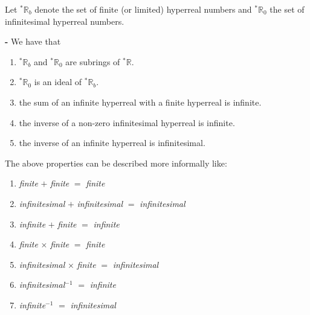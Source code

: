 \documentclass[12pt]{article}
\begin{document}
Let ${}^*\mathbb{R}_b$ denote the set of finite (or limited) hyperreal numbers and ${}^*\mathbb{R}_0$ the set of infinitesimal hyperreal numbers.

{\bf {} -} We have that
\begin{enumerate}
\item ${}^*\mathbb{R}_b$ and ${}^*\mathbb{R}_0$ are subrings of ${}^*\mathbb{R}$.
\item ${}^*\mathbb{R}_0$ is an ideal of ${}^*\mathbb{R}_b$.
\item the sum of an infinite hyperreal with a finite hyperreal is infinite.
\item the inverse of a non-zero infinitesimal hyperreal is infinite.
\item the inverse of an infinite hyperreal is infinitesimal.
\end{enumerate}

The above properties can be described more informally like:
\begin{enumerate}
\item \emph{finite} $+$ \emph{finite} $=$ \emph{finite}
\item \emph{infinitesimal} $+$ \emph{infinitesimal} $=$ \emph{infinitesimal}
\item \emph{infinite} $+$ \emph{finite} $=$ \emph{infinite}
\item \emph{finite} $\times$ \emph{finite} $=$ \emph{finite}
\item \emph{infinitesimal} $\times$ \emph{finite} $=$ \emph{infinitesimal}
\item \emph{infinitesimal}$^{-1}$ $=$  \emph{infinite}
\item \emph{infinite}$^{-1}$ $=$ \emph{infinitesimal}
\end{enumerate}
\end{document}
